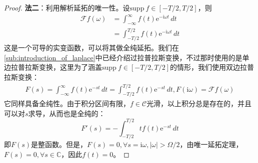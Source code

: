\begin{proof}
\textbf{法二}：利用解析延拓的唯一性。设$\text{supp}\ f\in[-T/2,T/2]$，则\begin{align*}
    \mathcal{F} f(\omega)&=\int_{-\infty}^{\infty}f(t)\mathrm{e}^{-\mathrm{i}\omega t}\,dt\\
    &=\int_{-T/2}^{T/2}f(t)\mathrm{e}^{-\mathrm{i}\omega t}\,dt
\end{align*}
这是一个可导的实变函数，可以将其做全纯延拓。我们在\ref{sub:introduction_of_laplace}中已经介绍过拉普拉斯变换，不过那时使用的是单边拉普拉斯变换，这里为了涵盖$\text{supp}\ f\in[-T/2,T/2]$的情形，我们使用双边拉普拉斯变换：
\begin{align*}
    F(s)=\int_{-\infty}^{\infty}f(t)\mathrm{e}^{-st}\,dt=\int_{-T/2}^{T/2}f(t)\mathrm{e}^{-st}\,dt,F(\mathrm{i}\omega)=\mathcal{F} f(\omega)
\end{align*}
它同样具备全纯性。由于积分区间有限，$f\in\mathcal{C} $光滑，以上积分总是存在的，并且可以对$s$求导，从而也是全纯的：\[F'(s)=-\int_{-T/2}^{T/2}tf(t)\mathrm{e}^{-st}\,dt\]
即$F(s)$是整函数。但是，$F(s)=0,\forall s=\mathrm{i}\omega,|\omega|> \Omega/2$，由唯一延拓定理，$F(s)=0,\forall s\in\mathbb{C}$，因此$f(t)=0$。
\end{proof}


